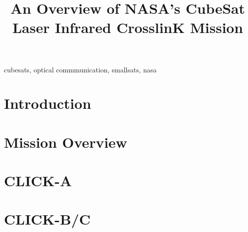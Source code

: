 \documentclass[conference]{IEEEtran}
\begin{document}
\title{An Overview of NASA's CubeSat Laser Infrared CrosslinK Mission \\}

\author{
}

\maketitle

\begin{abstract}
    
\end{abstract}

\begin{IEEEkeywords}
cubesats, optical commmunication, smallsats, nasa
\end{IEEEkeywords}

\section{Introduction}


\section{Mission Overview}


\section{CLICK-A}


\section{CLICK-B/C}








\end{document}
